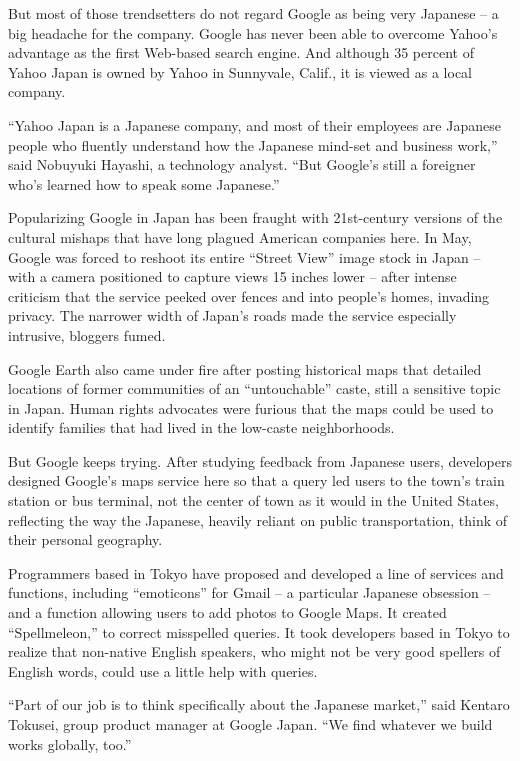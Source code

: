 ﻿\documentclass[12pt]{article}
\begin{document}
But most of those trendsetters do not regard Google as being very Japanese -- a big headache for the
company. Google has never been able to overcome Yahoo's advantage as the first Web-based search
engine. And although 35 percent of Yahoo Japan is owned by Yahoo in Sunnyvale, Calif., it is viewed
as a local company.

``Yahoo Japan is a Japanese company, and most of their employees are Japanese people who fluently
understand how the Japanese mind-set and business work,'' said Nobuyuki Hayashi, a technology
analyst. ``But Google's still a foreigner who's learned how to speak some Japanese.''

Popularizing Google in Japan has been fraught with 21st-century versions of the cultural mishaps
that have long plagued American companies here. In May, Google was forced to reshoot its entire
``Street View'' image stock in Japan -- with a camera positioned to capture views 15 inches lower --
after intense criticism that the service peeked over fences and into people's homes, invading
privacy. The narrower width of Japan's roads made the service especially intrusive, bloggers fumed.

Google Earth also came under fire after posting historical maps that detailed locations of former
communities of an ``untouchable'' caste, still a sensitive topic in Japan. Human rights advocates
were furious that the maps could be used to identify families that had lived in the low-caste
neighborhoods.

But Google keeps trying. After studying feedback from Japanese users, developers designed Google's
maps service here so that a query led users to the town's train station or bus terminal, not the
center of town as it would in the United States, reflecting the way the Japanese, heavily reliant on
public transportation, think of their personal geography.

Programmers based in Tokyo have proposed and developed a line of services and functions, including
``emoticons'' for Gmail -- a particular Japanese obsession -- and a function allowing users to add
photos to Google Maps. It created ``Spellmeleon,'' to correct misspelled queries. It took developers
based in Tokyo to realize that non-native English speakers, who might not be very good spellers of
English words, could use a little help with queries.

``Part of our job is to think specifically about the Japanese market,'' said Kentaro Tokusei, group
product manager at Google Japan. ``We find whatever we build works globally, too.''
\end{document}
